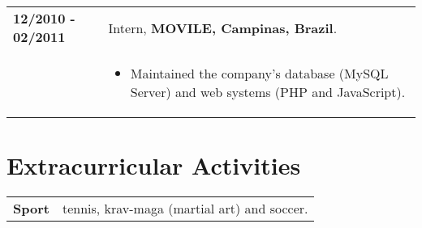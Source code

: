 \documentclass[10pt, a4paper]{article}
\begin{document}
\begin{tabular}{p{} p{}}
 
 \textbf{12/2010 - 02/2011} & Intern, \textbf{MOVILE, Campinas, Brazil}.\\
 &
 \vspace{-12pt}
	\begin{itemize} 
 	\item Maintained the company’s database (MySQL Server) and web systems (PHP
 	and JavaScript).  
	\end {itemize} 	\\
 
\end{tabular}


\section{Extracurricular Activities}

\begin{tabular}{p{} p{}}

\textbf{Sport} & tennis, krav-maga (martial art) and soccer. \\ 

\end{tabular}

\end{document}
